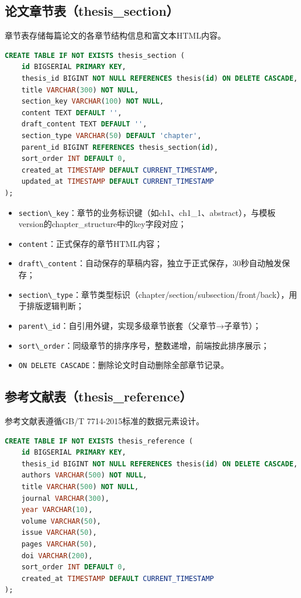 \documentclass{../softeng}
\begin{document}
\subsection{论文章节表（thesis\_section）}

章节表存储每篇论文的各章节结构信息和富文本HTML内容。

\begin{lstlisting}[language=SQL,caption={thesis\_section 建表语句}]
CREATE TABLE IF NOT EXISTS thesis_section (
    id BIGSERIAL PRIMARY KEY,
    thesis_id BIGINT NOT NULL REFERENCES thesis(id) ON DELETE CASCADE,
    title VARCHAR(300) NOT NULL,
    section_key VARCHAR(100) NOT NULL,
    content TEXT DEFAULT '',
    draft_content TEXT DEFAULT '',
    section_type VARCHAR(50) DEFAULT 'chapter',
    parent_id BIGINT REFERENCES thesis_section(id),
    sort_order INT DEFAULT 0,
    created_at TIMESTAMP DEFAULT CURRENT_TIMESTAMP,
    updated_at TIMESTAMP DEFAULT CURRENT_TIMESTAMP
);
\end{lstlisting}

\begin{itemize}
    \item \verb|section\_key|：章节的业务标识键（如ch1、ch1\_1、abstract），与模板version的chapter\_structure中的key字段对应；
    \item \verb|content|：正式保存的章节HTML内容；
    \item \verb|draft\_content|：自动保存的草稿内容，独立于正式保存，30秒自动触发保存；
    \item \verb|section\_type|：章节类型标识（chapter/section/subsection/front/back），用于排版逻辑判断；
    \item \verb|parent\_id|：自引用外键，实现多级章节嵌套（父章节→子章节）；
    \item \verb|sort\_order|：同级章节的排序序号，整数递增，前端按此排序展示；
    \item \verb|ON DELETE CASCADE|：删除论文时自动删除全部章节记录。
\end{itemize}

\subsection{参考文献表（thesis\_reference）}

参考文献表遵循GB/T 7714-2015标准的数据元素设计。

\begin{lstlisting}[language=SQL,caption={thesis\_reference 建表语句}]
CREATE TABLE IF NOT EXISTS thesis_reference (
    id BIGSERIAL PRIMARY KEY,
    thesis_id BIGINT NOT NULL REFERENCES thesis(id) ON DELETE CASCADE,
    authors VARCHAR(500) NOT NULL,
    title VARCHAR(500) NOT NULL,
    journal VARCHAR(300),
    year VARCHAR(10),
    volume VARCHAR(50),
    issue VARCHAR(50),
    pages VARCHAR(50),
    doi VARCHAR(200),
    sort_order INT DEFAULT 0,
    created_at TIMESTAMP DEFAULT CURRENT_TIMESTAMP
);
\end{lstlisting}
\end{document}
